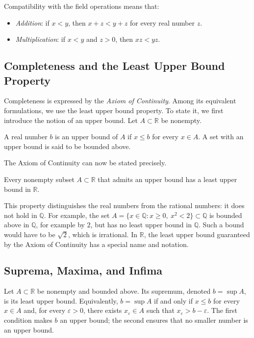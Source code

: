 Compatibility with the field operations means that:
\begin{itemize}
\item \textit{Addition}: if $x < y$, then $x + z < y + z$ for every real number $z$.
\item \textit{Multiplication}: if $x < y$ and $z > 0$, then $xz < yz$.
\end{itemize}

\subsection{Completeness and the Least Upper Bound Property}

Completeness is expressed by the \emph{Axiom of Continuity}. Among its equivalent formulations, we use the least upper bound property.
To state it, we first introduce the notion of an upper bound. Let $A \subset \mathbb{R}$ be nonempty.

\begin{definition}
A real number $b$ is an upper bound of $A$ if $x \leq b$ for every $x \in A$. A set with an upper bound is said to be bounded above.
\end{definition}

The Axiom of Continuity can now be stated precisely.

\begin{theorem}
Every nonempty subset $A \subset \mathbb{R}$ that admits an upper bound has a least upper bound in $\mathbb{R}$.
\end{theorem}

This property distinguishes the real numbers from the rational numbers: it does not hold in $\mathbb{Q}$. For example, the set $A = \{ x \in \mathbb{Q} : x \geq 0, \ x^2 < 2 \} \subset \mathbb{Q}$ is bounded above in $\mathbb{Q}$, for example by $2$, but has no least upper bound in $\mathbb{Q}$. Such a bound would have to be $\sqrt{2}$,
which is irrational. In $\mathbb{R}$, the least upper bound guaranteed by the Axiom of Continuity has a special name and notation.

\subsection{Suprema, Maxima, and Infima}

\begin{definition}
Let $A \subset \mathbb{R}$ be nonempty and bounded above. Its supremum, denoted $b = \sup A$, is its least upper bound.
Equivalently, $b = \sup A$ if and only if $x \leq b$ for every $x \in A$ and, for every $\varepsilon > 0$, there exists
$x_\varepsilon \in A$ such that $x_\varepsilon > b - \varepsilon$. The first condition makes $b$ an upper bound; the second ensures that no smaller number is an upper bound.
\end{definition}


